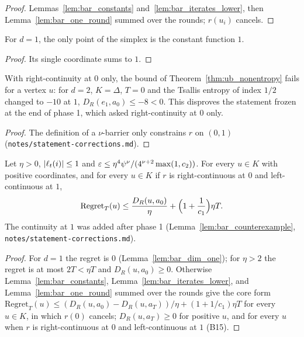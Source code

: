 \begin{proof}
  \leanok
  Lemmas~\ref{lem:bar_constants} and~\ref{lem:bar_iterates_lower}, then
  Lemma~\ref{lem:bar_one_round} summed over the rounds; $r(u_i)$ cancels.
\end{proof}

\begin{lemma}
  \label{lem:bar_dim_one}
  \leanok
  For $d = 1$, the only point of the simplex is the constant function $1$.
\end{lemma}

\begin{proof}
  \leanok
  Its single coordinate sums to $1$.
\end{proof}

\begin{lemma}
  \label{lem:bar_counterexample}
  \leanok
  With right-continuity at $0$ only, the bound of Theorem~\ref{thm:ub_nonentropy} fails for a vertex
  $u$: for $d = 2$, $K = \Delta$, $T = 0$ and the Tsallis entropy of index $1/2$ changed to $-10$
  at $1$, $D_R(e_1, a_0) \le -8 < 0$. This disproves the statement frozen at the end of phase 1,
  which asked right-continuity at $0$ only.
\end{lemma}

\begin{proof}
  \leanok
  The definition of a $\nu$-barrier only constrains $r$ on $(0, 1)$
  (\texttt{notes/statement-corrections.md}).
\end{proof}

\begin{theorem}
  \label{thm:ub_nonentropy}
  \leanok
  Let $\eta > 0$, $\lvert \ell_t(i) \rvert \le 1$ and
  $\varepsilon \le \eta^4\psi^\nu/(4^{\nu+2}\max(1, c_2))$. For every $u \in K$ with positive coordinates,
  and for every $u \in K$ if $r$ is right-continuous at $0$ and left-continuous at $1$,
  \[ \mathrm{Regret}_T(u) \le \frac{D_R(u, a_0)}{\eta} + \Bigl(1 + \frac1{c_1}\Bigr)\eta T. \]
  The continuity at $1$ was added after phase 1 (Lemma~\ref{lem:bar_counterexample},
  \texttt{notes/statement-corrections.md}).
\end{theorem}

\begin{proof}
  \leanok
  For $d = 1$ the regret is $0$ (Lemma~\ref{lem:bar_dim_one}); for $\eta > 2$ the regret is at most $2T < \eta T$ and
  $D_R(u, a_0) \ge 0$. Otherwise Lemma~\ref{lem:bar_constants},
  Lemma~\ref{lem:bar_iterates_lower}, and Lemma~\ref{lem:bar_one_round} summed over the rounds
  give the core form $\mathrm{Regret}_T(u) \le (D_R(u, a_0) - D_R(u, a_T))/\eta + (1 + 1/c_1)\eta T$
  for every $u \in K$, in which $r(0)$ cancels; $D_R(u, a_T) \ge 0$ for positive $u$, and for every
  $u$ when $r$ is right-continuous at $0$ and left-continuous at $1$ (B15).
\end{proof}
